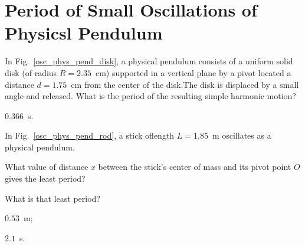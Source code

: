 \section{Period of Small Oscillations of Physicsl Pendulum}


\begin{problem}\label{prb:osc_phys_pend_disk}
	In Fig.~\ref{osc_phys_pend_disk}, a physical pendulum consists of a uniform solid disk (of radius $R = 2.35$~cm) supported in a vertical plane by a pivot located a distance $d = 1.75$~cm from the center of the disk.The disk is displaced by a small angle and released. What is the period of the resulting simple harmonic motion?
	\begin{solution}
		$0.366$~\si{\second}.
	\end{solution}
\end{problem}


\begin{problem}\label{prb:osc_phys_pend_rod}
	In Fig.~\ref{osc_phys_pend_rod}, a stick oflength $L = 1.85$~m oscillates as a physical pendulum. 
	\begin{enumerate*}[label=(\alph*)]
		\item What value of distance $x$ between the stick’s center of mass and its pivot point $O$ gives the least period?
		\item What is that least period?
	\end{enumerate*}
	\begin{solution}
		\begin{enumerate*}[label=(\alph*)]
			\item $0.53$~m; 
			\item $2.1$~s.
		\end{enumerate*}
	\end{solution}
\end{problem}


